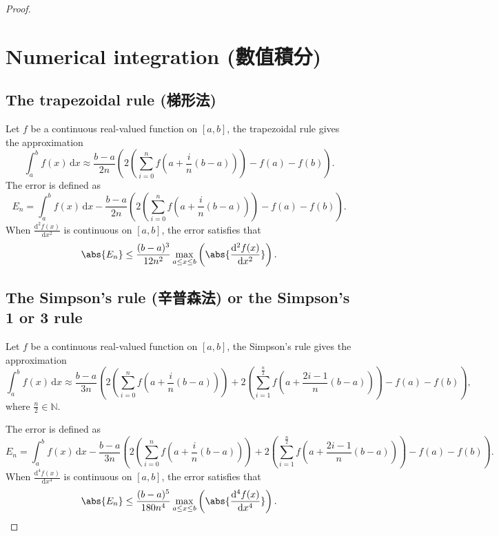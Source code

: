 \documentclass[a4paper,12pt]{report}
\begin{document}
\begin{proof}
{{{{{{\section{Numerical integration (數值積分)}
\subsection{The trapezoidal rule (梯形法)}
Let $f$ be a continuous real-valued function on $[a,b]$, the trapezoidal rule gives the approximation
\[\int_a^bf(x)\,\mathrm{d}x\approx\frac{b-a}{2n}\left(2\left(\sum_{i=0}^nf(a+\frac{i}{n}(b-a))\right)-f(a)-f(b)\right).\]
The error is defined as
\[E_n=\int_a^bf(x)\,\mathrm{d}x-\frac{b-a}{2n}\left(2\left(\sum_{i=0}^nf(a+\frac{i}{n}(b-a))\right)-f(a)-f(b)\right).\]
When $\frac{\mathrm{d}^2f(x)}{\mathrm{d}x^2}$ is continuous on $[a,b]$, the error satisfies that
\[\abs{E_n}\leq\frac{(b-a)^3}{12n^2}\max_{a\leq x\leq b}\left(\abs{\frac{\mathrm{d}^2f(x)}{\mathrm{d}x^2}}\right).\]
\subsection{The Simpson's rule (辛普森法) or the Simpson's 1 or 3 rule}
Let $f$ be a continuous real-valued function on $[a,b]$, the Simpson's rule gives the approximation
\[\int_a^bf(x)\,\mathrm{d}x\approx\frac{b-a}{3n}\left(2\left(\sum_{i=0}^nf(a+\frac{i}{n}(b-a))\right)+2\left(\sum_{i=1}^{\frac{n}{2}}f(a+\frac{2i-1}{n}(b-a))\right)-f(a)-f(b)\right),\]
where $\frac{n}{2}\in\mathbb{N}$.

The error is defined as
\[E_n=\int_a^bf(x)\,\mathrm{d}x-\frac{b-a}{3n}\left(2\left(\sum_{i=0}^nf(a+\frac{i}{n}(b-a))\right)+2\left(\sum_{i=1}^{\frac{n}{2}}f(a+\frac{2i-1}{n}(b-a))\right)-f(a)-f(b)\right).\]
When $\frac{\mathrm{d}^4f(x)}{\mathrm{d}x^4}$ is continuous on $[a,b]$, the error satisfies that
\[\abs{E_n}\leq\frac{(b-a)^5}{180n^4}\max_{a\leq x\leq b}\left(\abs{\frac{\mathrm{d}^4f(x)}{\mathrm{d}x^4}}\right).\]



}}}}}}
\end{proof}
\end{document}
